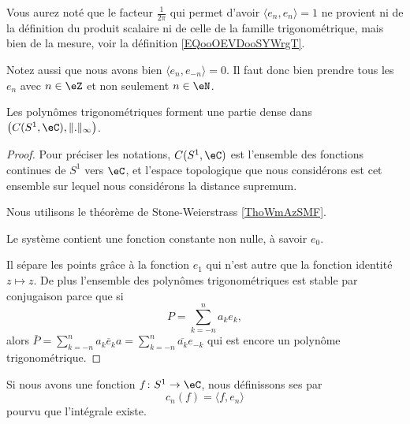 \begin{remark}
    Vous aurez noté que le facteur \( \frac{1}{ 2\pi }\) qui permet d'avoir \( \langle e_n, e_n\rangle=1 \) ne provient ni de la définition du produit scalaire ni de celle de la famille trigonométrique, mais bien de la mesure, voir la définition \ref{EQooOEVDooSYWrgT}.
\end{remark}

\begin{remark}      \label{REMooUCANooVyXPxj}
    Notez aussi que nous avons bien \( \langle e_n, e_{-n}\rangle =0\). Il faut donc bien prendre tous les \( e_n\) avec \( n\in \eZ\) et non seulement \( n\in \eN\).
\end{remark}

\begin{proposition}     \label{PROPooTGBHooXGhdPR}
    Les polynômes trigonométriques forment une partie dense dans \( \big( C(S^1,\eC),\| . \|_{\infty} \big)\).
\end{proposition}

\begin{proof}
    Pour préciser les notations, \( C(S^1,\eC)\) est l'ensemble des fonctions continues de \( S^1\) vers \( \eC\), et l'espace topologique que nous considérons est cet ensemble sur lequel nous considérons la distance supremum.

    Nous utilisons le théorème de Stone-Weierstrass \ref{ThoWmAzSMF}.

    Le système contient une fonction constante non nulle, à savoir \( e_0\).

    Il sépare les points grâce à la fonction \( e_1\) qui n'est autre que la fonction identité \( z\mapsto z\). De plus l'ensemble des polynômes trigonométriques est stable par conjugaison parce que si
    \begin{equation}
        P=\sum_{k=-n}^na_ke_k,
    \end{equation}
    alors \( \bar P=\sum_{k=-n}^n\overline{ a_k e_ka}=\sum_{k=-n}^n\overline{ a_k }e_{-k}\) qui est encore un polynôme trigonométrique.
\end{proof}

\begin{definition}
    Si nous avons une fonction \( f\colon S^1\to \eC\), nous définissons ses  par
    \begin{equation}
        c_n(f)=\langle f, e_n\rangle 
    \end{equation}
    pourvu que l'intégrale existe.
\end{definition}

